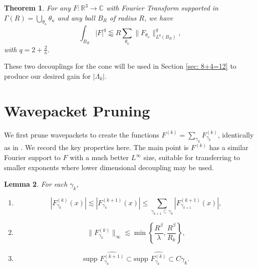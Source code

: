 \documentclass[12pt]{amsart}
\newtheorem{theorem}{Theorem}[section]
\newtheorem{lemma}[theorem]{Lemma}
\providecommand{\wh}{\widehat}
\providecommand{\C}{\mathbb C}
\providecommand{\R}{\mathbb R}
\begin{document}
\begin{theorem}\label{thm:small-capCone}\cite[Theorem 3]{maldague2022amplitudedependentwaveenvelope}  For any $F:\R^3\to \C$ with Fourier Transform supported in $\Gamma(R) = \bigcup_{\theta_\kappa} \theta_{\kappa}$ and any ball $B_R$ of radius $R$, we have $$\int_{B_R}|F|^q \lessapprox R\sum_{\theta_\kappa}\|F_{\theta_\kappa}\|_{L^q(B_R)}^q,$$ with $q = 2+\frac{2}{\kappa}.$ 
\end{theorem}
These two decouplings for the cone will be used in Section \ref{sec: 8+4=12} to produce our desired gain for $|\Lambda_k|.$




\section{Wavepacket Pruning}\label{sec:Pruning}
We first prune wavepackets to create the functions $F^{(k)}=\sum_{\gamma_k}F_{\gamma_k}^{(k)}$, identically as in \cite[Lemma 1]{Guth_2024}. We record the key properties here. The main point is $F^{(k)}$ has a similar Fourier support to $F$ with a much better $L^{\infty}$ size, suitable for transferring to smaller exponents where lower dimensional decoupling may be used.  

\begin{lemma}\label{lem:PruningProperties}
For each $\gamma_k$,
    \begin{enumerate}
        \item[a)] 
        $$|F^{(k)}_{\gamma_k}(x)|\lesssim |F^{(k+1)}_{\gamma_k}(x)|\le \sum_{\gamma_{k+1}\subset \gamma_k}|F_{\gamma_{k+1}}^{(k+1)}(x)|,$$

        \item[b)]  $$\|F_{\gamma_k}^{(k)}\|_\infty \lesssim \min \left\{\frac{R^{\beta}}{\lambda}, \frac{R^\beta}{R_k}\right\},$$

        \item[c)] $$\text{supp }\wh{F_{\gamma_k}^{(k+1)}}\subset \text{supp }\wh{F_{\gamma_k}^{(k)}}\subset C \gamma_k.$$
    \end{enumerate}
\end{lemma}
\end{document}
